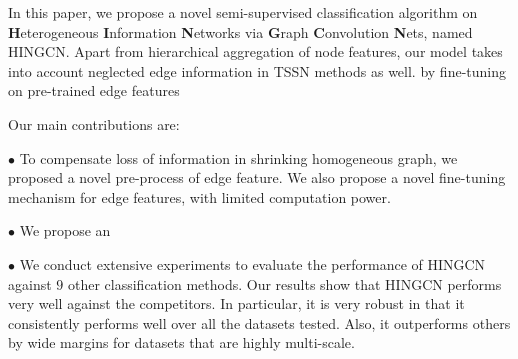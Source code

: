 
In this paper, we propose a novel semi-supervised classification algorithm on \textbf{H}eterogeneous \textbf{I}nformation \textbf{N}etworks via \textbf{G}raph \textbf{C}onvolution \textbf{N}ets, named HINGCN. Apart from hierarchical aggregation of node features, our model takes into account neglected edge information in TSSN methods as well.  by fine-tuning on pre-trained edge features


Our main contributions are:

\noindent$\bullet$
To compensate loss of information in shrinking homogeneous graph, we proposed a novel pre-process of edge feature. We also propose a novel fine-tuning mechanism for edge features, with limited computation power.

\noindent$\bullet$
We propose an 

\noindent$\bullet$
We conduct extensive experiments %
to evaluate the performance of HINGCN
against $9$ other classification methods. 
Our results show that HINGCN performs very well against the competitors. 
In particular, it is very robust in that it consistently performs well over all the datasets tested. 
Also, it outperforms others by wide margins for datasets that are highly multi-scale. 

